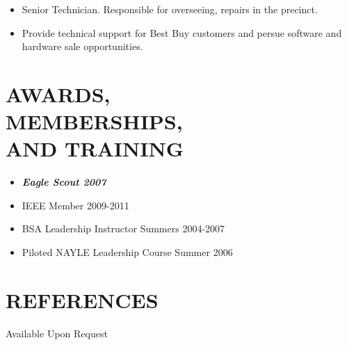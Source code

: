 \documentclass[line,margin]{res}
\begin{document}
\begin{resume}
\begin{itemize}  \itemsep -0.5pt %
\item Senior Technician. Responsible for overseeing, repairs in the precinct. 
\item Provide technical support for Best Buy customers and persue software and hardware sale opportunities.
\end{itemize} 

\section{AWARDS, \\ MEMBERSHIPS, \\ AND TRAINING}

\begin{itemize}  \itemsep -0.5pt %
	\item \textbf{\emph{Eagle Scout \hfill 2007}}
	\item IEEE Member \hfill 2009-2011
	\item BSA Leadership Instructor \hfill Summers 2004-2007
	\item Piloted NAYLE Leadership Course \hfill Summer 2006
\end{itemize}

\section{REFERENCES} 

\centering
Available Upon Request

\end{resume}
\end{document}
